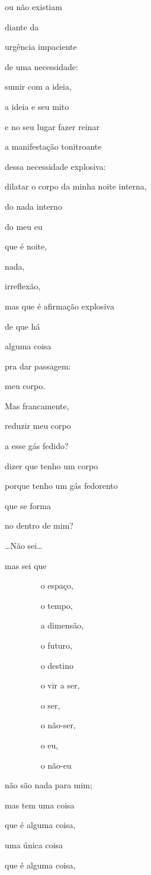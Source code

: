 ou não existiam

diante da

urgência impaciente

de uma necessidade:

sumir com a ideia,

a ideia e seu mito

e no seu lugar fazer reinar

a manifestação tonitroante

dessa necessidade explosiva:

dilatar o corpo da minha noite interna,

do nada interno

do meu eu

que é noite,

nada,

irreflexão,

mas que é afirmação explosiva

de que há

alguma coisa

pra dar passagem:

meu corpo.

Mas francamente, 

reduzir meu corpo

a esse gás fedido?

dizer que tenho um corpo

porque tenho um gás fedorento

que se forma

no dentro de mim?

\ldots{}Não sei\ldots{}

mas sei que

~~~~~~~~ o espaço,

~~~~~~~~ o tempo, 

~~~~~~~~ a dimensão,

~~~~~~~~ o futuro,

~~~~~~~~ o destino

~~~~~~~~ o vir a ser,

~~~~~~~~ o ser, 

~~~~~~~~ o não-ser, 

~~~~~~~~ o eu, 

~~~~~~~~ o não-eu

não são nada para mim;

mas tem uma coisa

que é alguma coisa,

uma única coisa

que é alguma coisa,


